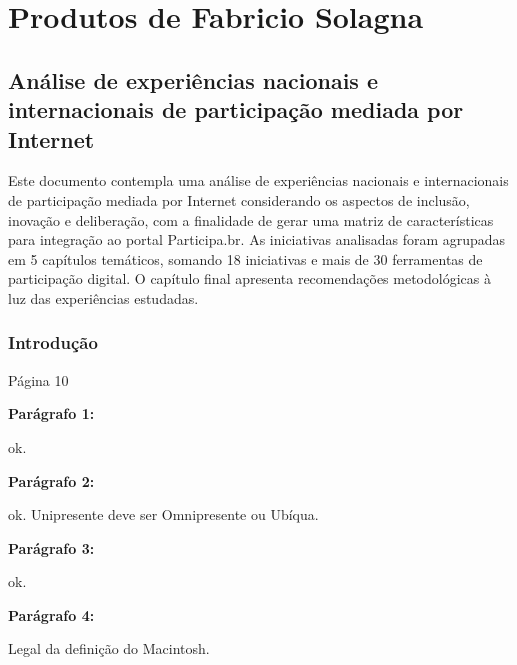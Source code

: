 \documentclass[12pt]{report}
\newcommand{\PalavrasChave}{reconhecimento de padrões, redes complexas, processamento de linguagem natural, participação social}
\newcommand{\pp}[1]{

\textbf{Parágrafo #1:}

}
\begin{document}



\tableofcontents
\newpage


\begin{abstract}
Este documento registra a reflexão sobre produtos dos outros consultores do mesmo projeto (BRA/12/018).
Cada consultor entrega alguns ``produtos'' para os órgãos interessados. No caso, são documentos escritos,
que relatam atividades, pesquisas, propostas, enfim, o que for pertinente para o trabalho.
Na leitura destes documentos, são registradas anotações pertinentes à consultoria de contrato 2013/000566, sob responsabilidade
do autor deste produto extra. Cada parte do documento corresponde a um consultor, cada capítulo corresponde
a um documento/produto, as seções e subseções correspondem à estrutura original de cada documento considerado.\\

{\bf Palavras-chave:} \PalavrasChave.
\end{abstract}
\newpage
\part{Produtos de Fabricio Solagna}
\chapter{Análise de experiências nacionais e internacionais de participação mediada por Internet}
Este documento contempla uma análise de experiências nacionais e internacionais de
participação mediada por Internet considerando os aspectos de inclusão, inovação e
deliberação, com a finalidade de gerar uma matriz de características para integração ao portal
Participa.br. As iniciativas analisadas foram agrupadas em 5 capítulos temáticos, somando 18
iniciativas e mais de 30 ferramentas de participação digital. O capítulo final apresenta
recomendações metodológicas à luz das experiências estudadas.

\section{Introdução}

Página 10

\pp{1} ok.

\pp{2} ok. Unipresente deve ser Omnipresente ou Ubíqua.

\pp{3} ok.

\pp{4} Legal da definição do Macintosh.
\end{document}
